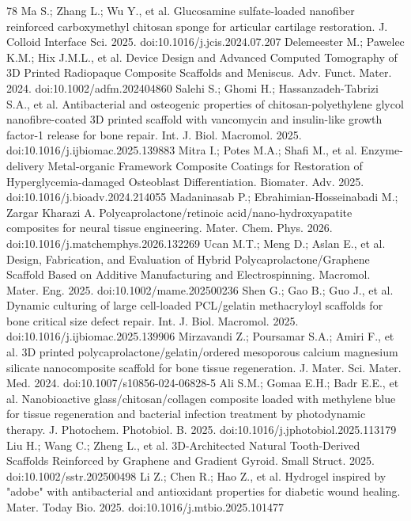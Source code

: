 \documentclass[5p,times,twocolumn]{elsarticle}
\begin{document}
\begin{thebibliography}{78}
 Ma S.; Zhang L.; Wu Y., et al. Glucosamine sulfate-loaded nanofiber reinforced carboxymethyl chitosan sponge for articular cartilage restoration. J. Colloid Interface Sci. 2025. doi:10.1016/j.jcis.2024.07.207
 Delemeester M.; Pawelec K.M.; Hix J.M.L., et al. Device Design and Advanced Computed Tomography of 3D Printed Radiopaque Composite Scaffolds and Meniscus. Adv. Funct. Mater. 2024. doi:10.1002/adfm.202404860
 Salehi S.; Ghomi H.; Hassanzadeh-Tabrizi S.A., et al. Antibacterial and osteogenic properties of chitosan-polyethylene glycol nanofibre-coated 3D printed scaffold with vancomycin and insulin-like growth factor-1 release for bone repair. Int. J. Biol. Macromol. 2025. doi:10.1016/j.ijbiomac.2025.139883
 Mitra I.; Potes M.A.; Shafi M., et al. Enzyme-delivery Metal-organic Framework Composite Coatings for Restoration of Hyperglycemia-damaged Osteoblast Differentiation. Biomater. Adv. 2025. doi:10.1016/j.bioadv.2024.214055
 Madaninasab P.; Ebrahimian-Hosseinabadi M.; Zargar Kharazi A. Polycaprolactone/retinoic acid/nano-hydroxyapatite composites for neural tissue engineering. Mater. Chem. Phys. 2026. doi:10.1016/j.matchemphys.2026.132269
 Ucan M.T.; Meng D.; Aslan E., et al. Design, Fabrication, and Evaluation of Hybrid Polycaprolactone/Graphene Scaffold Based on Additive Manufacturing and Electrospinning. Macromol. Mater. Eng. 2025. doi:10.1002/mame.202500236
 Shen G.; Gao B.; Guo J., et al. Dynamic culturing of large cell-loaded PCL/gelatin methacryloyl scaffolds for bone critical size defect repair. Int. J. Biol. Macromol. 2025. doi:10.1016/j.ijbiomac.2025.139906
 Mirzavandi Z.; Poursamar S.A.; Amiri F., et al. 3D printed polycaprolactone/gelatin/ordered mesoporous calcium magnesium silicate nanocomposite scaffold for bone tissue regeneration. J. Mater. Sci. Mater. Med. 2024. doi:10.1007/s10856-024-06828-5
 Ali S.M.; Gomaa E.H.; Badr E.E., et al. Nanobioactive glass/chitosan/collagen composite loaded with methylene blue for tissue regeneration and bacterial infection treatment by photodynamic therapy. J. Photochem. Photobiol. B. 2025. doi:10.1016/j.jphotobiol.2025.113179
 Liu H.; Wang C.; Zheng L., et al. 3D-Architected Natural Tooth-Derived Scaffolds Reinforced by Graphene and Gradient Gyroid. Small Struct. 2025. doi:10.1002/sstr.202500498
 Li Z.; Chen R.; Hao Z., et al. Hydrogel inspired by "adobe" with antibacterial and antioxidant properties for diabetic wound healing. Mater. Today Bio. 2025. doi:10.1016/j.mtbio.2025.101477

\end{thebibliography}
\end{document}
